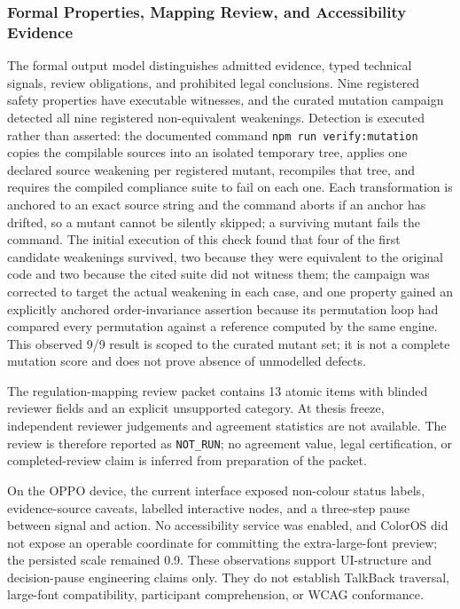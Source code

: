 \subsubsection{Formal Properties, Mapping Review, and Accessibility Evidence}

The formal output model distinguishes admitted evidence, typed technical signals, review obligations, and prohibited legal conclusions. Nine registered safety properties have executable witnesses, and the curated mutation campaign detected all nine registered non-equivalent weakenings. Detection is executed rather than asserted: the documented command \texttt{npm run verify:mutation} copies the compilable sources into an isolated temporary tree, applies one declared source weakening per registered mutant, recompiles that tree, and requires the compiled compliance suite to fail on each one. Each transformation is anchored to an exact source string and the command aborts if an anchor has drifted, so a mutant cannot be silently skipped; a surviving mutant fails the command. The initial execution of this check found that four of the first candidate weakenings survived, two because they were equivalent to the original code and two because the cited suite did not witness them; the campaign was corrected to target the actual weakening in each case, and one property gained an explicitly anchored order-invariance assertion because its permutation loop had compared every permutation against a reference computed by the same engine. This observed 9/9 result is scoped to the curated mutant set; it is not a complete mutation score and does not prove absence of unmodelled defects.

The regulation-mapping review packet contains 13 atomic items with blinded reviewer fields and an explicit unsupported category. At thesis freeze, independent reviewer judgements and agreement statistics are not available. The review is therefore reported as \texttt{NOT\_RUN}; no agreement value, legal certification, or completed-review claim is inferred from preparation of the packet.

On the OPPO device, the current interface exposed non-colour status labels, evidence-source caveats, labelled interactive nodes, and a three-step pause between signal and action. No accessibility service was enabled, and ColorOS did not expose an operable coordinate for committing the extra-large-font preview; the persisted scale remained 0.9. These observations support UI-structure and decision-pause engineering claims only. They do not establish TalkBack traversal, large-font compatibility, participant comprehension, or WCAG conformance.

